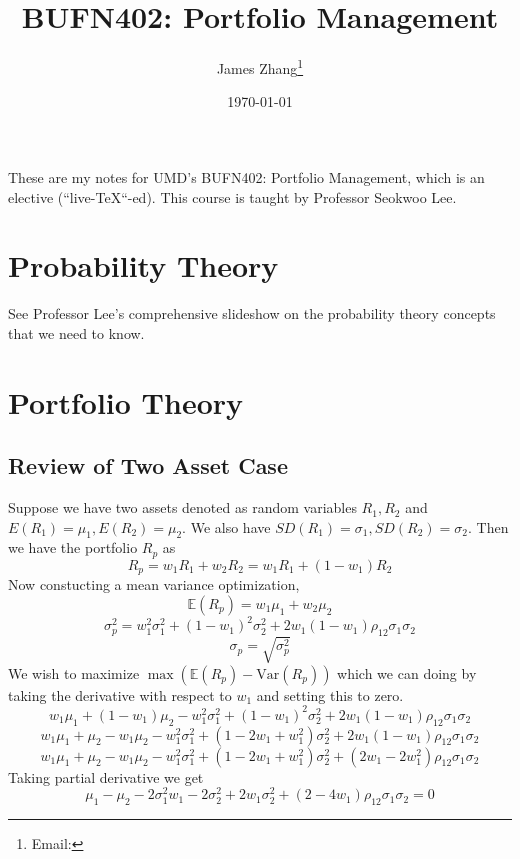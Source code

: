 \documentclass[12pt]{scrartcl}
\newcommand{\E}{\mathbb{E}}
\begin{document}
\title{BUFN402: Portfolio Management}
\author{James Zhang\thanks{Email: }}
\date{\today}



\maketitle
    These are my notes for UMD's BUFN402: Portfolio Management, 
    which is an elective (``live-\TeX``-ed). This course is taught by Professor Seokwoo Lee. 
\tableofcontents
\newpage

\section{Probability Theory}

See Professor Lee's comprehensive slideshow on the probability theory concepts that 
we need to know.

\section{Portfolio Theory}

\subsection{Review of Two Asset Case}

Suppose we have two assets denoted as random variables $R_1, R_2$ and $E(R_1) = \mu_1, E(R_2) = \mu_2$. 
We also have $SD(R_1) = \sigma_1, SD(R_2)= \sigma_2$. Then we have the portfolio $R_p$ as
\[R_p = w_1R_1 + w_2R_2 = w_1R_1 + (1 - w_1)R_2\]
Now constucting a mean variance optimization, 
\[\E(R_p) = w_1\mu_1 + w_2\mu_2\]
\[\sigma_p^2 = w_1^2\sigma_1^2 + (1-w_1)^2\sigma_2^2 + 2w_1(1-w_1)\rho_{12}\sigma_1\sigma_2\]
\[\sigma_p = \sqrt{\sigma_p^2}\]
We wish to maximize $\max(\E(R_p) - \text{Var}(R_p))$ which we can doing by taking the 
derivative with respect to $w_1$ and setting this to zero. 
\[w_1\mu_1 + (1-w_1)\mu_2 - w_1^2\sigma_1^2 + (1-w_1)^2\sigma_2^2 + 2w_1(1-w_1)\rho_{12}\sigma_1\sigma_2\]
\[w_1\mu_1 + \mu_2-w_1\mu_2 - w_1^2\sigma_1^2 + (1-2w_1 + w_1^2)\sigma_2^2 + 2w_1(1-w_1)\rho_{12}\sigma_1\sigma_2\]
\[w_1\mu_1 + \mu_2-w_1\mu_2 - w_1^2\sigma_1^2 + (1-2w_1 + w_1^2)\sigma_2^2 + (2w_1-2w_1^2)\rho_{12}\sigma_1\sigma_2\]
Taking partial derivative we get
\[\mu_1 - \mu_2 - 2\sigma_1^2w_1 - 2\sigma_2^2 + 2w_1\sigma_2^2 + (2-4w_1)\rho_{12}\sigma_1\sigma_2 = 0\]
\end{document}
